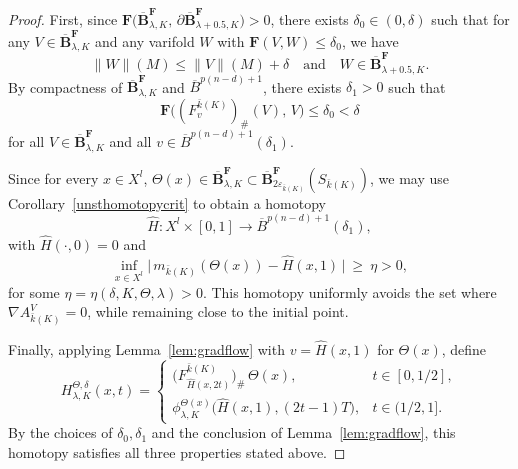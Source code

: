 \documentclass[12pt,english]{article}
\theoremstyle{definition}
\begin{document}
\begin{proof}
First, since \(\mathbf{F}\bigl(\overline{\mathbf{B}}^\mathbf{F}_{\lambda,K},\,\partial \overline{\mathbf{B}}^\mathbf{F}_{\lambda+0.5,K}\bigr)>0\), there exists \(\delta_0\in(0,\delta)\) such that for any \(V\in \overline{\mathbf{B}}^\mathbf{F}_{\lambda,K}\) and any varifold \(W\) with \(\mathbf{F}(V,W)\le \delta_0\), we have
\[
\|W\|(M)\le \|V\|(M)+\delta
\quad\text{and}\quad
W\in \overline{\mathbf{B}}^\mathbf{F}_{\lambda+0.5,K}.
\]
By compactness of \(\overline{\mathbf{B}}^\mathbf{F}_{\lambda,K}\) and \(\overline{B}^{p(n-d)+1}\), there exists \(\delta_1>0\) such that
\[
\mathbf{F}\bigl((F^{\bar k(K)}_{v})_\#(V),\,V\bigr)\le \delta_0<\delta
\]
for all \(V\in \overline{\mathbf{B}}^\mathbf{F}_{\lambda,K}\) and all \(v\in \overline{B}^{p(n-d)+1}(\delta_1)\).

Since for every \(x\in X^l\), \(\Theta(x)\in \overline{\mathbf{B}}^\mathbf{F}_{\lambda,K}\subset \overline{\mathbf{B}}^\mathbf{F}_{2\varepsilon_{\bar k(K)}}(S_{\bar k(K)})\), we may use Corollary~\ref{unsthomotopycrit} to obtain a homotopy
\[
\widehat H:X^l\times[0,1]\to \overline{B}^{p(n-d)+1}(\delta_1),
\]
with \(\widehat H(\cdot,0)=0\) and
\[
\inf_{x\in X^l}\bigl|\,m_{\bar k(K)}(\Theta(x))-\widehat H(x,1)\,\bigr|\ \ge \ \eta>0,
\]
for some \(\eta=\eta(\delta,K,\Theta,\lambda)>0\). This homotopy uniformly avoids the set where \(\nabla A^{V}_{\bar k(K)}=0\), while remaining close to the initial point.

Finally, applying Lemma~\ref{lem:gradflow} with \(v=\widehat H(x,1)\) for \(\Theta(x)\), define
\[
H^{\Theta,\delta}_{\lambda,K}(x,t)=
\begin{cases}
\bigl(F^{\bar k(K)}_{\widehat H(x,2t)}\bigr)_{\#}\,\Theta(x), & t\in[0,1/2],\\[2pt]
\phi^{\Theta(x)}_{\lambda,K}\bigl(\widehat H(x,1),(2t-1)T\bigr), & t\in(1/2,1].
\end{cases}
\]
By the choices of \(\delta_0,\delta_1\) and the conclusion of Lemma~\ref{lem:gradflow}, this homotopy satisfies all three properties stated above.
\end{proof}
\end{document}
